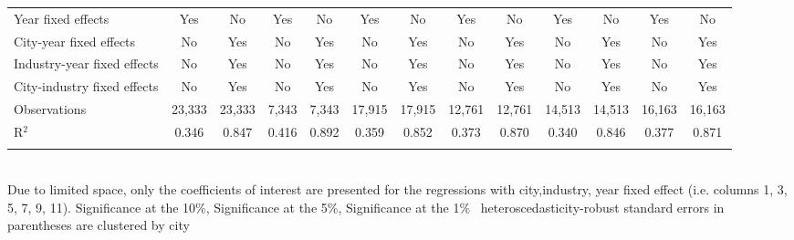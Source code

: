 \documentclass[12pt]{article}
\begin{document}
\begin{table}[!htbp]
\begin{adjustbox}{width=\textwidth, totalheight=\baselineskip,keepaspectratio}
\begin{tabular}{@{\extracolsep{5pt}}lcccccccccccc}
Year fixed effects & Yes & No & Yes & No & Yes & No & Yes & No & Yes & No & Yes & No \\ 
City-year fixed effects & No & Yes & No & Yes & No & Yes & No & Yes & No & Yes & No & Yes \\ 
Industry-year fixed effects & No & Yes & No & Yes & No & Yes & No & Yes & No & Yes & No & Yes \\ 
City-industry fixed effects & No & Yes & No & Yes & No & Yes & No & Yes & No & Yes & No & Yes \\ 
Observations & 23,333 & 23,333 & 7,343 & 7,343 & 17,915 & 17,915 & 12,761 & 12,761 & 14,513 & 14,513 & 16,163 & 16,163 \\ 
R$^{2}$ & 0.346 & 0.847 & 0.416 & 0.892 & 0.359 & 0.852 & 0.373 & 0.870 & 0.340 & 0.846 & 0.377 & 0.871 \\ 
\hline 
\hline \\[-1.8ex] 
\end{tabular}
\end{adjustbox}
\begin{tablenotes} 
 \small 
 \item \\ 
\footnotesize{
Due to limited space, only the coefficients of interest are presented 
for the regressions with city,industry, year fixed effect (i.e. columns 1, 3, 5, 7, 9, 11).
\sym{*} Significance at the 10\%, \sym{**} Significance at the 5\%, \sym{***} Significance at the 1\% \
heteroscedasticity-robust standard errors in parentheses are clustered by city 
}
 
\end{tablenotes}
\end{table}
\end{document}
